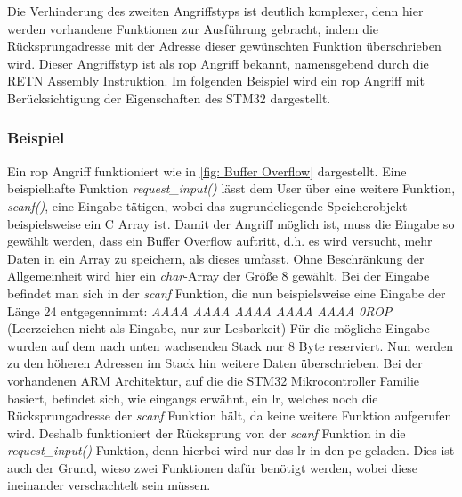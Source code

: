 \documentclass[a4paper,
DIV=13,
12pt,
BCOR=10mm,
department=FakIM,
oneside,
parskip=half,
automark,
listof=totocnumbered,
bibliography=totocnumbered,
acronym=totocnumbered
] {OTHRartcl}
\begin{document}
Die Verhinderung des zweiten Angriffstyps ist deutlich komplexer, denn hier werden vorhandene Funktionen zur Ausführung gebracht, indem die Rücksprungadresse mit der Adresse
dieser gewünschten Funktion überschrieben wird. %
Dieser Angriffstyp ist als \ac{rop} Angriff bekannt, namensgebend durch die RETN Assembly Instruktion.
Im folgenden Beispiel wird ein \ac{rop} Angriff mit Berücksichtigung der Eigenschaften des STM32 dargestellt.

\subsubsection{Beispiel}
Ein \ac{rop} Angriff funktioniert wie in \autoref{fig: Buffer Overflow} dargestellt.
Eine beispielhafte Funktion \textit{request\_input()} lässt dem User über eine weitere Funktion, \textit{scanf()}, eine Eingabe tätigen, wobei das zugrundeliegende Speicherobjekt beispielsweise ein C Array ist.
Damit der Angriff möglich ist, muss die Eingabe so gewählt werden, dass ein Buffer Overflow auftritt, d.h. es wird versucht, mehr Daten in ein Array zu speichern, als dieses umfasst.
Ohne Beschränkung der Allgemeinheit wird hier ein \textit{char}-Array der Größe $8$ gewählt. Bei der Eingabe befindet man sich in der \textit{scanf} Funktion, die nun beispielsweise eine Eingabe der Länge 24 entgegennimmt:
\textit{AAAA AAAA AAAA AAAA AAAA 0ROP}  (Leerzeichen nicht als Eingabe, nur zur Lesbarkeit)
Für die mögliche Eingabe wurden auf dem nach unten wachsenden Stack nur 8 Byte reserviert.
Nun werden zu den höheren Adressen im Stack hin weitere Daten überschrieben.
Bei der vorhandenen ARM Architektur, auf die die STM32 Mikrocontroller Familie basiert, befindet sich, wie eingangs erwähnt, ein \ac{lr}, welches noch die Rücksprungadresse der \textit{scanf} Funktion hält, da keine weitere Funktion aufgerufen wird.
Deshalb funktioniert der Rücksprung von der \textit{scanf} Funktion in die \textit{request\_input()} Funktion, denn hierbei wird nur das \ac{lr} in den \ac{pc} geladen.
Dies ist auch der Grund, wieso zwei Funktionen dafür benötigt werden, wobei diese ineinander verschachtelt sein müssen.
\end{document}
